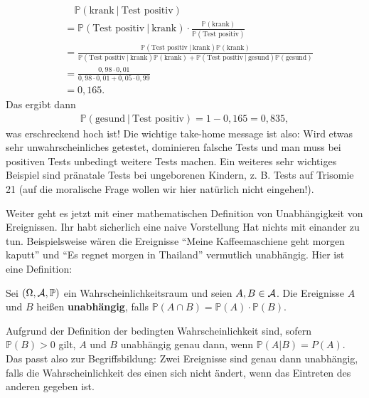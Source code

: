 \begin{beispiel}
\begin{enumerate}[label=(\roman*)]
		\begin{align*}
			&\quad \mathbb{P}(\text{krank} \: | \: \text{Test positiv})\\
			 &= \mathbb{P}(\text{Test positiv} \: | \: \text{krank}) \cdot \frac{\mathbb{P}(\text{krank})}{\mathbb{P}(\text{Test positiv})}\\
			&=	\frac{\mathbb{P}(\text{Test positiv} \: | \: \text{krank}) \mathbb{P}(\text{krank})}{\mathbb{P}(\text{Test positiv} \: | \: \text{krank})\mathbb{P}(\text{krank}) + \mathbb{P}(\text{Test positiv} \: | \: \text{gesund})\mathbb{P}(\text{gesund})}\\
			&= \frac{0,98 \cdot 0,01}{0,98 \cdot 0,01 + 0,05 \cdot 0,99} \\
			&= 0,165.
		\end{align*}
		Das ergibt dann
		\begin{align*}
			\mathbb{P}(\text{gesund} \: | \: \text{Test positiv}) = 1 - 0,165 = 0,835,
		\end{align*}
		was erschreckend hoch ist! Die wichtige take-home message ist also: Wird etwas sehr unwahrscheinliches getestet, dominieren falsche Tests und man muss bei positiven Tests unbedingt weitere Tests machen. Ein weiteres sehr wichtiges Beispiel sind pr\"anatale Tests bei ungeborenen Kindern, z. B. Tests auf Trisomie 21 (auf die moralische Frage wollen wir hier nat\"urlich nicht eingehen!).
	\end{enumerate}
\end{beispiel}
Weiter geht es jetzt mit einer mathematischen Definition von Unabh\"angigkeit von Ereignissen. Ihr habt sicherlich eine naive Vorstellung \glqq Hat nichts mit einander zu tun\grqq. Beispielsweise w\"aren die Ereignisse \enquote{Meine Kaffeemaschiene geht morgen kaputt} und \enquote{Es regnet morgen in Thailand} vermutlich unabh\"angig. Hier ist eine Definition:
\begin{deff}\label{def:unab}
	Sei $(\Omega, \mathcal{A}, \mathbb{P})$ ein Wahrscheinlichkeitsraum und seien $A,B \in \mathcal{A}$. Die Ereignisse $A$ und $B$ heißen \textbf{unabhängig}, falls $\mathbb{P}(A \cap B) = \mathbb{P}(A) \cdot \mathbb{P}(B)$.
\end{deff}
Aufgrund der Definition der bedingten Wahrscheinlichkeit sind, sofern $\mathbb P(B)>0$ gilt, $A$ und $B$ unabh\"angig genau dann, wenn $\mathbb P(A|B)=P(A)$. Das passt also zur Begriffsbildung: Zwei Ereignisse sind genau dann unabh\"angig, falls die Wahrscheinlichkeit des einen sich nicht \"andert, wenn das Eintreten des anderen gegeben ist.\smallskip

